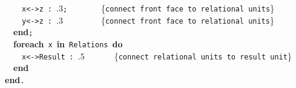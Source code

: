 ~~~~\verb&x&\verb&<->&\verb&z&~\verb&:&~$.3$\verb&;&~~~~~~~~{\footnotesize \{\verb{connect front face to relational units{\}}\\
~~~~\verb&y&\verb&<->&\verb&z&~\verb&:&~$.3$~~~~~~~~~{\footnotesize \{\verb{connect front face to relational units{\}}\\
~~{\bf end}\verb&;&~\\
~~{\bf foreach}~\verb&x&~{\bf in}~\verb&Relations&~{\bf do}\\
~~~~\verb&x&\verb&<->&\verb&Result&~\verb&:&~$.5$~~~~~~~{\footnotesize \{\verb{connect relational units to result unit{\}}\\
~~{\bf end}\\
{\bf end}\verb&.&\\